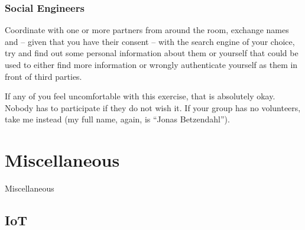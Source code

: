 \documentclass[aspectratio=169,dvipsnames]{beamer}
\begin{document}
\begin{frame}
\frametitle{Social Engineers}

Coordinate with one or more partners from around the room, exchange names and -- given that you have their consent -- with the search engine of your choice, try and find out some personal information about them or yourself that could be used to either find more information or wrongly authenticate yourself as them in front of third parties.
\bigskip

If any of you feel uncomfortable with this exercise, that is absolutely okay. Nobody has to participate if they do not wish it. If your group has no volunteers, take me instead (my full name, again, is ``Jonas Betzendahl'').

\end{frame}



\section{Miscellaneous}

\begin{frame}
\begin{center}
\huge Miscellaneous
\end{center}
\end{frame}

\subsection{IoT}
\end{document}
